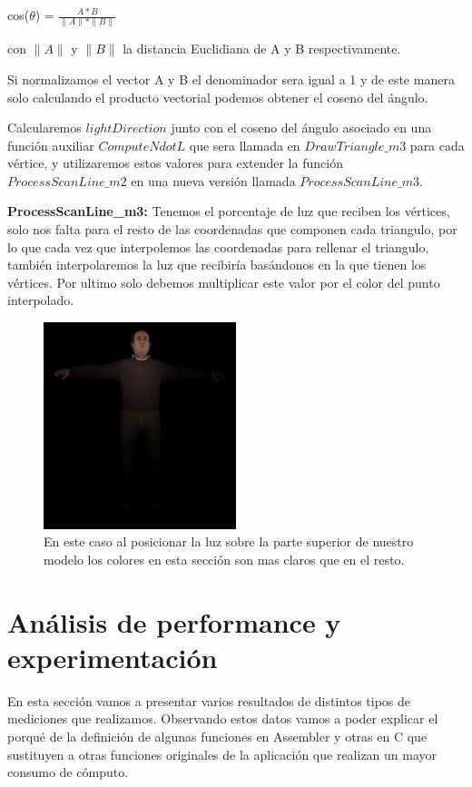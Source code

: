 \documentclass[a4paper]{article}
\newcounter{col}
\begin{document}
cos($\theta$) = $\frac{A*B}{\parallel A \parallel*\parallel B \parallel}$ \newline

con $\parallel A \parallel$ y $\parallel B \parallel$ la distancia Euclidiana de A y B respectivamente.
 
Si normalizamos el vector A y B el denominador  sera igual a  1 y de este manera solo calculando el producto vectorial podemos obtener el coseno del ángulo. 
\par Calcularemos $lightDirection$ junto con el coseno del ángulo asociado en una función auxiliar $ComputeNdotL$ que sera llamada en $DrawTriangle\_m3$ para cada vértice, y utilizaremos estos valores para extender la función $ProcessScanLine\_m2$ en una nueva versión llamada $ProcessScanLine\_m3$.
   
\textbf{ ProcessScanLine\_m3:}
Tenemos el porcentaje de luz que reciben los vértices, solo nos falta para el resto de las coordenadas que componen cada triangulo,  por lo que cada vez que interpolemos las coordenadas para rellenar el triangulo, también interpolaremos la luz que recibiría  basándonos en la que tienen los vértices. Por ultimo solo debemos multiplicar este valor por el color del punto interpolado.  

\begin{figure}[h]
    \centering
    \includegraphics[width=0.50\textwidth]{Imagenes/modo3.png}
    \caption{En este caso al posicionar la luz sobre la parte superior de nuestro modelo los colores en esta sección son mas claros que en el resto.}
    \label{modo3}
\end{figure}


\section{Análisis de performance y experimentación}
En esta sección vamos a presentar varios resultados de distintos tipos de mediciones que realizamos. Observando estos datos vamos a poder explicar el porqué de la definición de algunas funciones en Assembler y otras en C que sustituyen a otras funciones originales de la aplicación que realizan un mayor consumo de cómputo.
\end{document}
